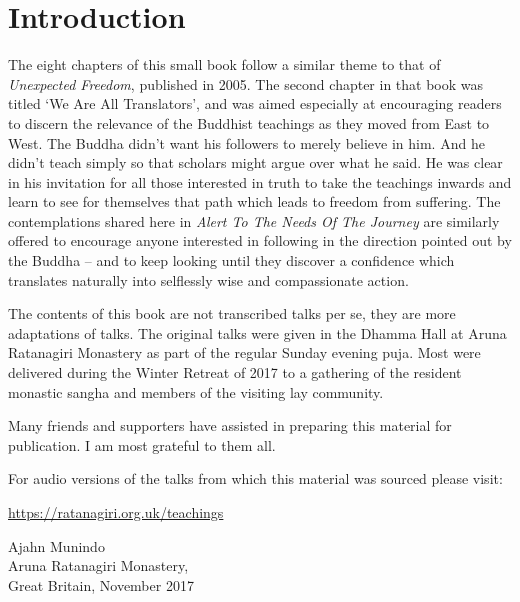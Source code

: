 
\chapter{Introduction}

The eight chapters of this small book follow a similar theme to that of
\emph{Unexpected Freedom}, published in 2005. The second chapter in that book
was titled ‘We Are All Translators’, and was aimed especially at
encouraging readers to discern the relevance of the Buddhist teachings
as they moved from East to West. The Buddha didn’t want his followers to
merely believe in him. And he didn’t teach simply so that scholars might
argue over what he said. He was clear in his invitation for all those
interested in truth to take the teachings inwards and learn to see for
themselves that path which leads to freedom from suffering. The
contemplations shared here in \emph{Alert To The Needs Of The Journey} are
similarly offered to encourage anyone interested in following in the
direction pointed out by the Buddha – and to keep looking until they
discover a confidence which translates naturally into selflessly wise
and compassionate action.

The contents of this book are not transcribed talks per se, they are
more adaptations of talks. The original talks were given in the Dhamma
Hall at Aruna Ratanagiri Monastery as part of the regular Sunday evening
puja. Most were delivered during the Winter Retreat of 2017 to a
gathering of the resident monastic sangha and members of the visiting
lay community.

Many friends and supporters have assisted in preparing this material for
publication. I am most grateful to them all.

For audio versions of the talks from which this material was sourced please
visit:

\href{https://ratanagiri.org.uk/teachings}{https://ratanagiri.org.uk/teachings}

\bigskip

{\raggedleft
Ajahn Munindo \\
Aruna Ratanagiri Monastery, \\
Great Britain, November 2017
\par}

